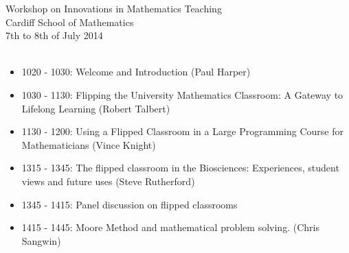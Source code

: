 \documentclass[a4paper]{article}
\begin{document}



\begin{center}
    {\Huge Workshop on Innovations in Mathematics Teaching}\\
    {\tiny Cardiff School of Mathematics}\\
    {\tiny 7th to 8th of July 2014}\\
    \vspace{1cm}
    {}\\
\end{center}

\vspace{1cm}

\begin{center}
\end{center}

\begin{itemize}
    \item 1020 - 1030: Welcome and Introduction (Paul Harper)
    \item 1030 - 1130: Flipping the University Mathematics Classroom: A Gateway to Lifelong Learning (Robert Talbert)
    \item 1130 - 1200: Using a Flipped Classroom in a Large Programming Course for Mathematicians (Vince Knight)
\end{itemize}

\vspace{1cm}

\begin{center}
\end{center}

\vspace{1cm}

\begin{center}
\end{center}

\begin{itemize}
    \item 1315 - 1345: The flipped classroom in the Biosciences: Experiences, student views and future uses (Steve Rutherford)
    \item 1345 - 1415: Panel discussion on flipped classrooms
    \item 1415 - 1445: Moore Method and mathematical problem solving. (Chris Sangwin)
\end{itemize}
\end{document}
